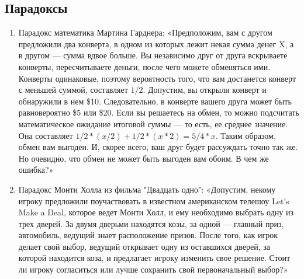 \documentclass[a4paper,12pt]{article}
\begin{document}
    \subsection*{Парадоксы}
    \begin{enumerate}
        \item Парадокс математика Мартина Гарднера: «Предположим, вам с другом предложили два конверта, в одном из которых лежит некая сумма денег X, а в другом — сумма вдвое больше. Вы независимо друг от друга вскрываете конверты, пересчитываете деньги, после чего можете обменяться ими. Конверты одинаковые, поэтому вероятность того, что вам достанется конверт с меньшей суммой, составляет $1/2$. Допустим, вы открыли конверт и обнаружили в нем \$10. Следовательно, в конверте вашего друга может быть равновероятно \$5 или \$20. Если вы решаетесь на обмен, то можно подсчитать математическое ожидание итоговой суммы — то есть, ее среднее значение. Она составляет $1/2 * (x/2) +1/2* (x *2)=5/4 * x$. Таким образом, обмен вам выгоден. И, скорее всего, ваш друг будет рассуждать точно так же. Но очевидно, что обмен не может быть выгоден вам обоим. В чем же ошибка?»
        \item Парадокс Монти Холла из фильма "Двадцать одно": «Допустим, некому игроку предложили поучаствовать в известном американском телешоу Let’s Make a Deal, которое ведет Монти Холл, и ему необходимо выбрать одну из трех дверей. За двумя дверьми находятся козы, за одной — главный приз, автомобиль, ведущий знает расположение призов. После того, как игрок делает свой выбор, ведущий открывает одну из оставшихся дверей, за которой находится коза, и предлагает игроку изменить свое решение. Стоит ли игроку согласиться или лучше сохранить свой первоначальный выбор?»
    \end{enumerate}
\end{document}
